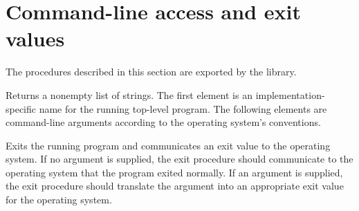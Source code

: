 \chapter{Command-line access and exit values}
\label{programlibchapter}

The procedures described in this section are exported by the
 library.

\begin{entry}{%
}

Returns a nonempty list of strings.
The first element is an implementation-specific
name for the running top-level program.  The following elements are command-line
arguments according to the operating system's conventions.
\end{entry}

\begin{entry}{%
}

Exits the running program and communicates an exit value to the 
operating system.  If no argument is supplied, the {\cf exit}
procedure should communicate to the operating system that the program 
exited normally.  If an argument is supplied, the {\cf exit} procedure 
should translate the argument into an appropriate exit value for the 
operating system.
\end{entry}

